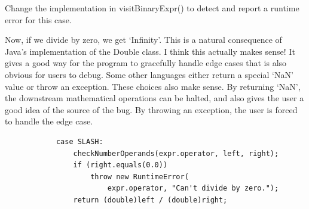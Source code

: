 \documentclass{article}
\begin{document}
\begin{enumerate}
{        Change the implementation in visitBinaryExpr() to detect and report a runtime error for this case.

        Now, if we divide by zero, we get `Infinity'. This is a natural consequence 
        of Java's implementation of the Double class. I think this actually makes 
        sense! It gives a good way for the program to gracefully handle edge cases
        that is also obvious for users to debug. Some other languages either return 
        a special `NaN' value or throw an exception. These choices also make sense.
        By returning `NaN', the downstream mathematical operations can be halted,
        and also gives the user a good idea of the source of the bug. By throwing
        an exception, the user is forced to handle the edge case. 

        \begin{lstlisting}
            case SLASH:
                checkNumberOperands(expr.operator, left, right);
                if (right.equals(0.0)) 
                    throw new RuntimeError(
                        expr.operator, "Can't divide by zero.");
                return (double)left / (double)right;
        \end{lstlisting}

    }
\end{enumerate}
\end{document}
